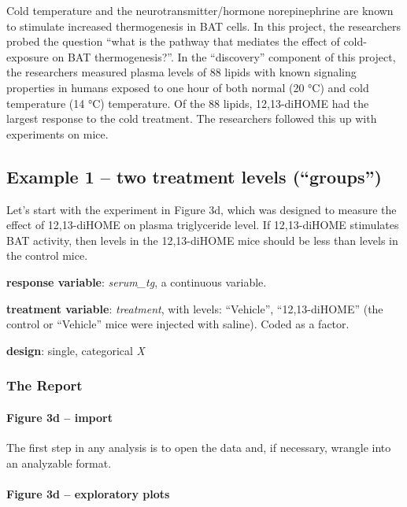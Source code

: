 \documentclass[]{book}
\let\oldparagraph\paragraph
\renewcommand{\paragraph}[1]{\oldparagraph{#1}\mbox{}}
\begin{document}
Cold temperature and the neurotransmitter/hormone norepinephrine are known to stimulate increased thermogenesis in BAT cells. In this project, the researchers probed the question ``what is the pathway that mediates the effect of cold-exposure on BAT thermogenesis?''. In the ``discovery'' component of this project, the researchers measured plasma levels of 88 lipids with known signaling properties in humans exposed to one hour of both normal (20 °C) and cold temperature (14 °C) temperature. Of the 88 lipids, 12,13-diHOME had the largest response to the cold treatment. The researchers followed this up with experiments on mice.

\hypertarget{example-1-two-treatment-levels-groups}{%
\subsection{Example 1 -- two treatment levels (``groups'')}\label{example-1-two-treatment-levels-groups}}

Let's start with the experiment in Figure 3d, which was designed to measure the effect of 12,13-diHOME on plasma triglyceride level. If 12,13-diHOME stimulates BAT activity, then levels in the 12,13-diHOME mice should be less than levels in the control mice.

\textbf{response variable}: \emph{serum\_tg}, a continuous variable.

\textbf{treatment variable}: \emph{treatment}, with levels: ``Vehicle'', ``12,13-diHOME'' (the control or ``Vehicle'' mice were injected with saline). Coded as a factor.

\textbf{design}: single, categorical \emph{X}

\hypertarget{the-report}{%
\subsubsection{The Report}\label{the-report}}

\hypertarget{figure-3d-import}{%
\paragraph{Figure 3d -- import}\label{figure-3d-import}}

The first step in any analysis is to open the data and, if necessary, wrangle into an analyzable format.

\hypertarget{figure-3d-exploratory-plots}{%
\paragraph{Figure 3d -- exploratory plots}\label{figure-3d-exploratory-plots}}
\end{document}

